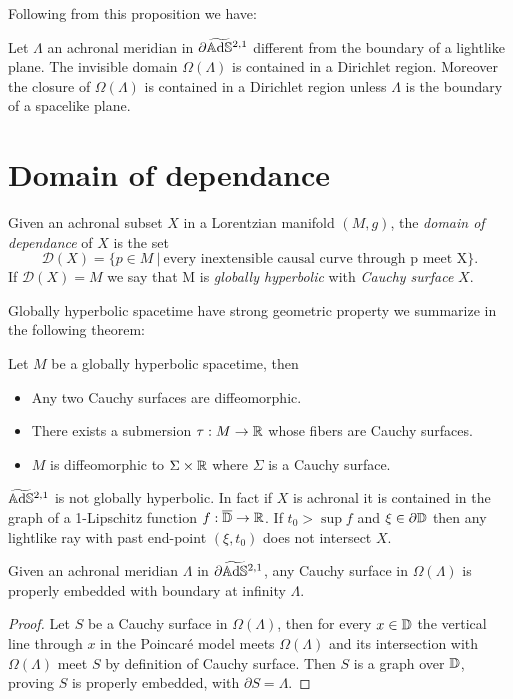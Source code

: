 Following from this proposition we have:
\begin{proposition} \label{prop:invisible2}
    Let $\Lambda$ an achronal meridian in $\partial\widetilde{\mathbb{A}\mathrm{d}\mathbb{S}}{}^{2,1}$ different from the boundary of a lightlike plane. The invisible domain $\Omega(\Lambda)$ is contained in a Dirichlet region. Moreover the closure of $\Omega(\Lambda)$ is contained in a Dirichlet region unless $\Lambda$ is the boundary of a spacelike plane.
\end{proposition}
\section{Domain of dependance}
\begin{definition}
    Given an achronal subset $X$ in a Lorentzian manifold $(M,g)$, the \textit{domain of dependance} of $X$ is the set
    \[
        \mathcal{D}(X)= \{ p \in M \ | \ \text{every inextensible causal curve through p meet X} \}.
    \]
    If $\mathcal{D}(X)=M$ we say that M is  \textit{globally hyperbolic} with \textit{Cauchy surface} $X$.
\end{definition}
Globally hyperbolic spacetime have strong geometric property we summarize in the following theorem:
\begin{theorem} \label{GH_structure}
    Let $M$ be a globally hyperbolic spacetime, then
    \begin{itemize}
        \item Any two Cauchy surfaces are diffeomorphic.
        \item There  exists a submersion $\tau : M \to \mathbb{R}$ whose fibers are Cauchy surfaces.
        \item $M$ is diffeomorphic to $\Sigma \times \mathbb{R}$ where $\Sigma$ is a Cauchy surface.
    \end{itemize}
\end{theorem}
\begin{observation}
    $\widetilde{\mathbb{A}\mathrm{d}\mathbb{S}}{}^{2,1}$ is not globally hyperbolic. In fact if $X$ is achronal it is contained in the graph of a 1-Lipschitz function $f: \overline{\mathbb{D}} \to \mathbb{R}$. If $t_0 > \sup f$ and $\xi \in \partial\mathbb{D}$ then any lightlike ray with past end-point $(\xi,t_0)$ does not intersect $X$.
\end{observation}
\begin{lemma}
    Given an achronal meridian $\Lambda$ in $\partial\widetilde{\mathbb{A}\mathrm{d}\mathbb{S}}{}^{2,1}$, any Cauchy surface in $\Omega(\Lambda)$ is properly embedded with boundary at infinity $\Lambda$.
\end{lemma}
\begin{proof}
    Let $S$ be a Cauchy surface in $\Omega(\Lambda)$, then for every $x\in \mathbb{D}$ the vertical line through $x$ in the Poincaré model meets $\Omega(\Lambda)$ and its intersection with $\Omega(\Lambda)$ meet $S$ by definition of Cauchy surface. Then $S$ is a graph over $\mathbb{D}$, proving $S$ is properly embedded, with $\partial S = \Lambda$.
\end{proof}
